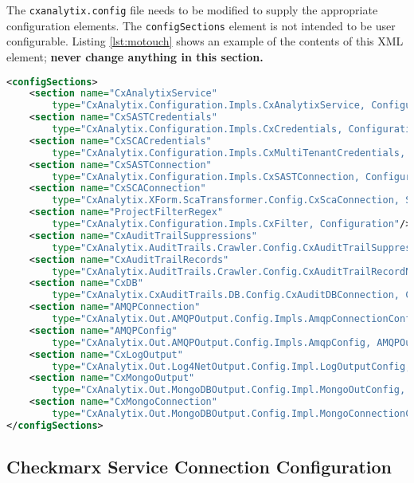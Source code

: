 The \texttt{cxanalytix.config} file needs to be modified to supply the appropriate configuration elements.  The \texttt{configSections}
element is not intended to be user configurable.  Listing \ref{lst:motouch} shows an example of the contents of this XML element;
\textbf{never change anything in this section.}

\begin{lstlisting}[caption={Part of the Configuration File to Never Change}, label={lst:motouch}, language=XML, basicstyle=\ttfamily\tiny]
<configSections>
    <section name="CxAnalytixService" 
        type="CxAnalytix.Configuration.Impls.CxAnalytixService, Configuration" />
    <section name="CxSASTCredentials" 
        type="CxAnalytix.Configuration.Impls.CxCredentials, Configuration" />
    <section name="CxSCACredentials" 
        type="CxAnalytix.Configuration.Impls.CxMultiTenantCredentials, Configuration" />
    <section name="CxSASTConnection" 
        type="CxAnalytix.Configuration.Impls.CxSASTConnection, Configuration" />
    <section name="CxSCAConnection" 
        type="CxAnalytix.XForm.ScaTransformer.Config.CxScaConnection, ScaTransformer" />
    <section name="ProjectFilterRegex" 
        type="CxAnalytix.Configuration.Impls.CxFilter, Configuration"/>
    <section name="CxAuditTrailSuppressions" 
        type="CxAnalytix.AuditTrails.Crawler.Config.CxAuditTrailSuppressions, CxAuditTrailsCrawler"/>
    <section name="CxAuditTrailRecords" 
        type="CxAnalytix.AuditTrails.Crawler.Config.CxAuditTrailRecordNameMap, CxAuditTrailsCrawler"/>
    <section name="CxDB" 
        type="CxAnalytix.CxAuditTrails.DB.Config.CxAuditDBConnection, CxAuditTrailsDB"/>
    <section name="AMQPConnection" 
        type="CxAnalytix.Out.AMQPOutput.Config.Impls.AmqpConnectionConfig, AMQPOutput"/>
    <section name="AMQPConfig" 
        type="CxAnalytix.Out.AMQPOutput.Config.Impls.AmqpConfig, AMQPOutput"/>
    <section name="CxLogOutput" 
        type="CxAnalytix.Out.Log4NetOutput.Config.Impl.LogOutputConfig, Log4NetOutput" />
    <section name="CxMongoOutput" 
        type="CxAnalytix.Out.MongoDBOutput.Config.Impl.MongoOutConfig, MongoDBOutput" />
    <section name="CxMongoConnection" 
        type="CxAnalytix.Out.MongoDBOutput.Config.Impl.MongoConnectionConfig, MongoDBOutput" />
</configSections>
\end{lstlisting}

\subsection{Checkmarx Service Connection Configuration}\label{sec:connection}

